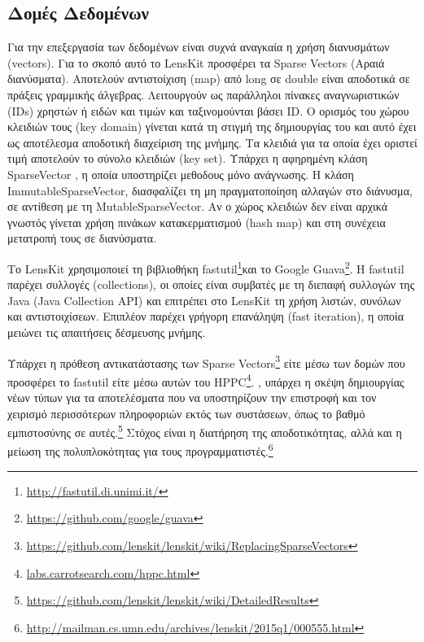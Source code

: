 \subsection{Δομές Δεδομένων}
Για την επεξεργασία των δεδομένων είναι συχνά αναγκαία η χρήση διανυσμάτων ({\en vectors}). Για το σκοπό αυτό το {\en LensKit} προσφέρει τα \en Sparse Vectors \el(Αραιά διανύσματα). Αποτελούν αντιστοίχιση ({\en map}) από {\en long} σε \en double  είναι αποδοτικά σε πράξεις γραμμικής άλγεβρας. Λειτουργούν ως παράλληλοι πίνακες αναγνωριστικών (\en IDs) \el χρηστών ή ειδών και τιμών και ταξινομούνται βάσει \en ID. \el Ο ορισμός του χώρου κλειδιών τους (\en key domain) \el γίνεται κατά τη στιγμή της δημιουργίας του και αυτό έχει ως αποτέλεσμα αποδοτική διαχείριση της μνήμης. Τα κλειδιά για τα οποία έχει οριστεί τιμή αποτελούν το σύνολο κλειδιών \en(key set). \el Υπάρχει η αφηρημένη κλάση \en SparseVector \el, η οποία υποστηρίζει μεθοδους μόνο ανάγνωσης. Η κλάση \en ImmutableSparseVector, \el διασφαλίζει τη μη πραγματοποί\-ηση αλλαγών στο διάνυσμα, σε αντίθεση με τη \en MutableSparseVector. \el Αν ο χώρος κλειδιών δεν είναι αρχικά γνωστός γίνεται χρήση πινάκων κατακερματισμού \en (hash map) \el και στη συνέχεια μετατροπή τους σε διανύσματα. \par
Το \en LensKit \el χρησιμοποιεί τη βιβλιοθήκη \en fastutil\footnote{\url{http://fastutil.di.unimi.it/}}\el και το \en Google Guava\footnote{\url{https://github.com/google/guava}}. H fastutil \el παρέχει συλλογές \en (collections), \el οι οποίες είναι συμβατές με τη διεπαφή συλλογών της \en Java (Java Collection API) \el και επιτρέπει στο \en LensKit \el τη χρήση λιστών, συνόλων και αντιστοιχίσεων. Επιπλέον παρέχει γρήγορη επανάληψη (\en fast iteration), \el η οποία μειώνει τις απαιτήσεις δέσμευσης μνήμης. \par
Υπάρχει η πρόθεση αντικατάστασης των \en Sparse Vectors\footnote{\url{https://github.com/lenskit/lenskit/wiki/ReplacingSparseVectors}} \el είτε μέσω των δομών που προσφέρει το \en fastutil \el είτε μέσω αυτών του \en HPPC\footnote{\url{labs.carrotsearch.com/hppc.html}}. , υπάρχει η σκέψη δημιουργίας νέων τύπων για τα αποτελέσματα που να υποστηρίζουν την επιστροφή και τον χειρισμό περισσότερων πληροφοριών εκτός των συστάσεων, όπως το βαθμό εμπιστοσύνης σε αυτές.\footnote{\en \url{https://github.com/lenskit/lenskit/wiki/DetailedResults}} Στόχος είναι η διατήρηση της αποδοτικότητας, αλλά και η μείωση της πολυπλοκότητας για τους προγραμματιστές.\footnote{\en \url{http://mailman.cs.umn.edu/archives/lenskit/2015q1/000555.html}}
